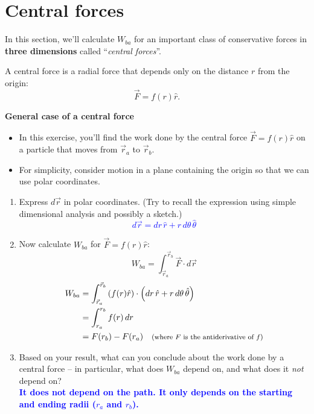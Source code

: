 \documentclass[11pt, letterpaper, openany]{book}
\newenvironment{exercise}[1][Exercise]{%
  \tcolorbox[blanker, breakable, left=1em,
    before skip=1em, after skip=1em,
    borderline west={3pt}{0pt}{PhysNavy},
    colback=PhysCream,
    before upper={\textcolor{PhysNavy}{\sffamily\bfseries #1:}\space}
  ]%
}{%
  \endtcolorbox%
}
\begin{document}
\section*{Central forces}

In this section, we'll calculate $W_{ba}$ for an important class of conservative forces in \textbf{three dimensions} called ``\textit{central forces}''.

A central force is a radial force that depends only on the distance $r$ from the origin:
\[ \vec{F} = f(r)\hat{r}. \]

\begin{exercise}[Exercise 5]
\textbf{General case of a central force}
\begin{itemize}
    \item In this exercise, you'll find the work done by the central force $\vec{F} = f(r)\hat{r}$ on a particle that moves from $\vec{r}_a$ to $\vec{r}_b$.
    \item For simplicity, consider motion in a plane containing the origin so that we can use polar coordinates.
\end{itemize}

\begin{enumerate}[label=(\alph*)]
    \item Express $d\vec{r}$ in polar coordinates. (Try to recall the expression using simple dimensional analysis and possibly a sketch.) \\
    \textcolor{blue}{\[ d\vec{r} = dr\,\hat{r} + r\,d\theta\,\hat{\theta} \]}
    
    \item Now calculate $W_{ba}$ for $\vec{F} = f(r)\hat{r}$:
    \[ W_{ba} = \int_{\vec{r}_a}^{\vec{r}_b} \vec{F} \cdot d\vec{r} \]
    \textcolor{blue}{
    \begin{align*}
        W_{ba} &= \int_{\vec{r}_a}^{\vec{r}_b} \left( f(r)\hat{r} \right) \cdot \left( dr\,\hat{r} + r\,d\theta\,\hat{\theta} \right) \\
        &= \int_{r_a}^{r_b} f(r)\,dr \\
        &= F(r_b) - F(r_a) \quad \text{\footnotesize{(where $F$ is the antiderivative of $f$)}}
    \end{align*}
    }
    
    \item Based on your result, what can you conclude about the work done by a central force -- in particular, what does $W_{ba}$ depend on, and what does it \textit{not} depend on? \\
    \textcolor{blue}{\textbf{It does not depend on the path. It only depends on the starting and ending radii ($r_a$ and $r_b$).}}
\end{enumerate}
\end{exercise}
\end{document}
